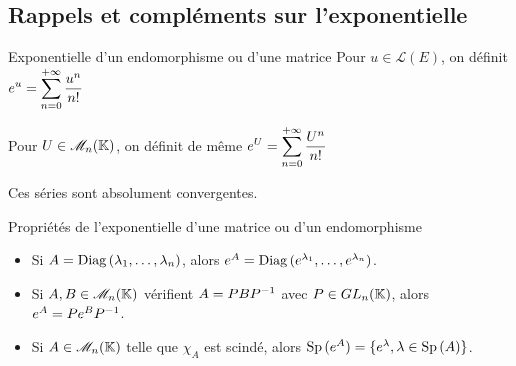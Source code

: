 \subsection{Rappels et compléments sur l'exponentielle}

\begin{definition}{Exponentielle d'un endomorphisme ou d'une matrice}{}
    Pour $u \in \mathscr L(E)$, on définit $\displaystyle e^u = \sum_{n = 0}^{+ \infty} \frac{u^n}{n!}$

    Pour $U \in \mathscr M_n(\mathbb{K})$, on définit de même $\displaystyle e^U = \sum_{n = 0}^{+ \infty} \frac{U^n}{n!}$
    
    Ces séries sont absolument convergentes. 
\end{definition}

\begin{propositionnt}{Propriétés de l'exponentielle d'une matrice ou d'un endomorphisme}{}
    \begin{itemize}
        \item  Si $A = \operatorname{Diag} \, (\lambda_1, \dots, \lambda_n)$, alors $e^A = \operatorname{Diag} \, (e^{\lambda_1}, \dots, e^{\lambda_n})$.
        \item Si $A, B \in \mathscr M_n(\mathbb{K})$ vérifient $A = PBP^{-1}$ avec $P \in GL_n(\mathbb{K})$, alors $e^A = P e^B P^{-1}$.
        \item Si $A \in \mathscr M_n(\mathbb{K})$ telle que $\chi_A$ est scindé, alors 
        $\operatorname{Sp} \,(e^A) = \{e^\lambda, \lambda \in \operatorname{Sp} \,(A)\}$. 
    \end{itemize}
\end{propositionnt}

